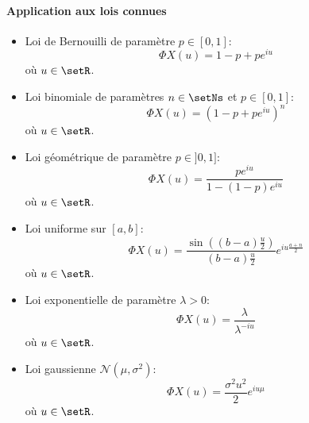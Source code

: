 \documentclass[a4paper,10pt,french,openany]{memoir}
\newcommand{\normale}{\mathcal{N}}
\begin{document}
\paragraph{Application aux lois connues}
\begin{itemize}
 \item Loi de Bernouilli de paramètre $p\in[0,1]$:
 \[ \Phi X(u) = 1-p+pe^{iu} \] où $u\in\setR$.
 
 \item Loi binomiale de paramètres $n\in\setNs$ et $p\in[0,1]$:
 \[ \Phi X(u) = (1-p + pe^{iu})^n \] où $u\in\setR$.
 
 \item Loi géométrique de paramètre $p\in]0,1]$:
 \[ \Phi X(u) = \frac{pe^{iu}}{1-(1-p)e^{iu}} \] où $u\in\setR$.
 
 \item Loi uniforme sur $[a,b]$:
 \[ \Phi X(u) = \frac{\sin((b-a)\frac u 2)}{(b-a)\frac u 2} e^{iu \frac{a+n}2} \] où $u\in\setR$.
 
 \item Loi exponentielle de paramètre $\lambda>0$:
 \[ \Phi X(u) = \frac \lambda {\lambda^{-iu}} \] où $u\in\setR$.
 
 \item Loi gaussienne $\normale(\mu, \sigma^2)$:
 \[ \Phi X(u) = \frac{\sigma^2 u^2}2 e^{iu\mu} \] où $u\in\setR$.
\end{itemize}
\end{document}

